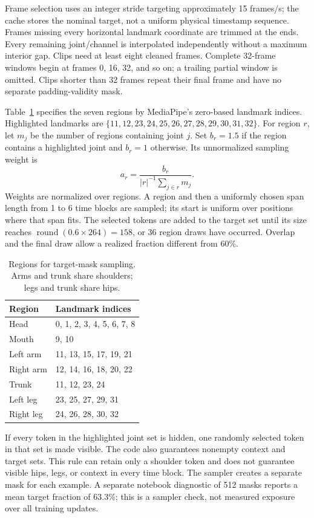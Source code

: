 \documentclass[10pt,twocolumn,letterpaper]{article}
\begin{document}
Frame selection uses an integer stride targeting approximately 15 frames/s; the cache stores the nominal target, not a uniform physical timestamp sequence. Frames missing every horizontal landmark coordinate are trimmed at the ends. Every remaining joint/channel is interpolated independently without a maximum interior gap. Clips need at least eight cleaned frames. Complete 32-frame windows begin at frames 0, 16, 32, and so on; a trailing partial window is omitted. Clips shorter than 32 frames repeat their final frame and have no separate padding-validity mask.

Table~\ref{tab:regions} specifies the seven regions by MediaPipe's zero-based landmark indices. Highlighted landmarks are $\{11,12,23,24,25,26,27,28,29,30,31,32\}$. For region $r$, let $m_j$ be the number of regions containing joint $j$. Set $b_r=1.5$ if the region contains a highlighted joint and $b_r=1$ otherwise. Its unnormalized sampling weight is
\begin{equation}
a_r=\frac{b_r}{|r|^{-1}\sum_{j\in r}m_j}.
\end{equation}
Weights are normalized over regions. A region and then a uniformly chosen span length from 1 to 6 time blocks are sampled; its start is uniform over positions where that span fits. The selected tokens are added to the target set until its size reaches $\operatorname{round}(0.6\times264)=158$, or 36 region draws have occurred. Overlap and the final draw allow a realized fraction different from 60\%.

\begin{table}[t]
\centering
\caption{Regions for target-mask sampling. Arms and trunk share shoulders; legs and trunk share hips.}
\label{tab:regions}
\small\setlength{\tabcolsep}{5pt}
\begin{tabular}{ll}
\toprule
Region & Landmark indices\\
\midrule
Head &0, 1, 2, 3, 4, 5, 6, 7, 8\\
Mouth &9, 10\\
Left arm &11, 13, 15, 17, 19, 21\\
Right arm &12, 14, 16, 18, 20, 22\\
Trunk &11, 12, 23, 24\\
Left leg &23, 25, 27, 29, 31\\
Right leg &24, 26, 28, 30, 32\\
\bottomrule
\end{tabular}
\end{table}

If every token in the highlighted joint set is hidden, one randomly selected token in that set is made visible. The code also guarantees nonempty context and target sets. This rule can retain only a shoulder token and does not guarantee visible hips, legs, or context in every time block. The sampler creates a separate mask for each example. A separate notebook diagnostic of 512 masks reports a mean target fraction of 63.3\%; this is a sampler check, not measured exposure over all training updates.
\end{document}
